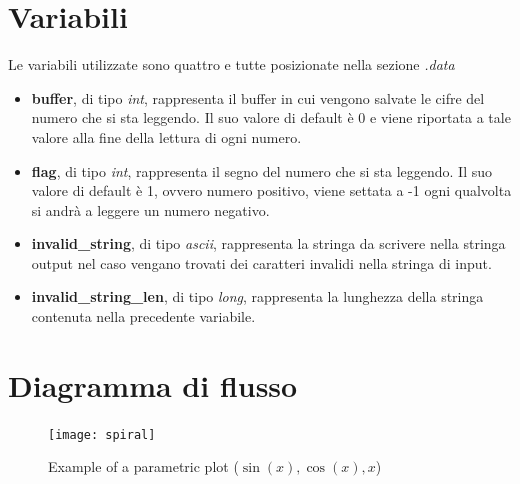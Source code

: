 \documentclass[a4paper,11pt,oneside]{book}
\begin{document}
\section{Variabili}
Le variabili utilizzate sono quattro e tutte posizionate nella sezione \emph{.data}

\begin{itemize}
  \item \textbf{buffer}, di tipo \emph{int}, rappresenta il buffer in cui vengono salvate le cifre del numero che si sta leggendo. Il suo valore di default è 0 e viene riportata a tale 
  valore alla fine della lettura di ogni numero.

  \item \textbf{flag}, di tipo \emph{int}, rappresenta il segno del numero che si sta leggendo. Il suo valore di default è 1, ovvero numero positivo, viene settata a -1 ogni qualvolta si andrà
  a leggere un numero negativo.

  \item \textbf{invalid\_string}, di tipo \emph{ascii}, rappresenta la stringa da scrivere nella stringa output nel caso vengano trovati dei caratteri invalidi nella stringa di input.
  
  \item \textbf{invalid\_string\_len}, di tipo \emph{long}, rappresenta la lunghezza della stringa contenuta nella precedente variabile.
\end{itemize}

\section{Diagramma di flusso}
\begin{figure}[h]
  \caption{Example of a parametric plot ($\sin (x), \cos(x), x$)}
  \centering
  \texttt{[image: spiral]}
  \end{figure}
\end{document}
